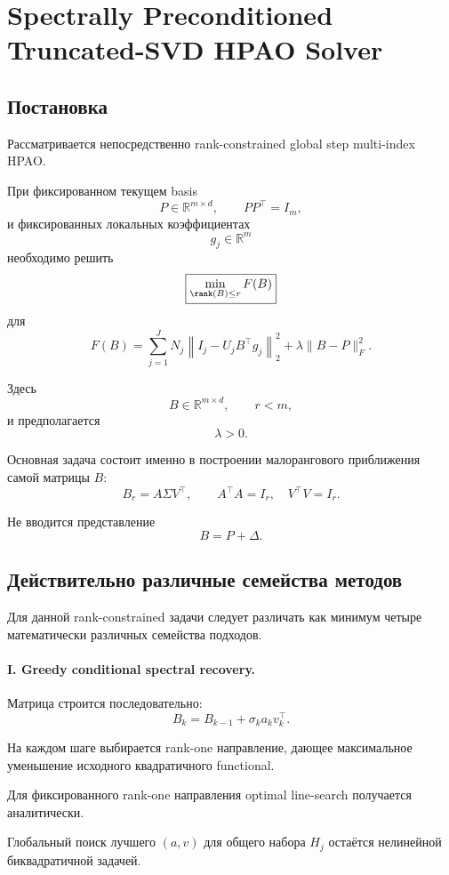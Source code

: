 \section{Spectrally Preconditioned Truncated-SVD HPAO Solver}

\subsection{Постановка}

Рассматривается непосредственно rank-constrained global step
multi-index HPAO.

При фиксированном текущем basis
\[
    P\in\mathbb R^{m\times d},
    \qquad
    PP^\top=I_m,
\]
и фиксированных локальных коэффициентах
\[
    g_j\in\mathbb R^m
\]
необходимо решить
\[
\boxed{
    \min_{\rank(B)\le r}
    F(B)
}
\]
для
\[
\boxed{
    F(B)
    =
    \sum_{j=1}^J
    N_j
    \left\|
        I_j-U_jB^\top g_j
    \right\|_2^2
    +
    \lambda
    \|B-P\|_F^2.
}
\]

Здесь
\[
    B\in\mathbb R^{m\times d},
    \qquad
    r<m,
\]
и предполагается
\[
    \lambda>0.
\]

Основная задача состоит именно в построении малорангового
приближения самой матрицы $B$:
\[
\boxed{
    B_r
    =
    A\Sigma V^\top,
    \qquad
    A^\top A=I_r,
    \quad
    V^\top V=I_r.
}
\]

Не вводится представление
\[
    B=P+\Delta.
\]

\subsection{Действительно различные семейства методов}

Для данной rank-constrained задачи следует различать как минимум
четыре математически различных семейства подходов.

\paragraph{I. Greedy conditional spectral recovery.}

Матрица строится последовательно:
\[
    B_k
    =
    B_{k-1}
    +
    \sigma_k a_kv_k^\top.
\]

На каждом шаге выбирается rank-one направление,
дающее максимальное уменьшение исходного квадратичного functional.

Для фиксированного rank-one направления optimal line-search
получается аналитически.

Глобальный поиск лучшего $(a,v)$ для общего набора $H_j$
остаётся нелинейной биквадратичной задачей.

